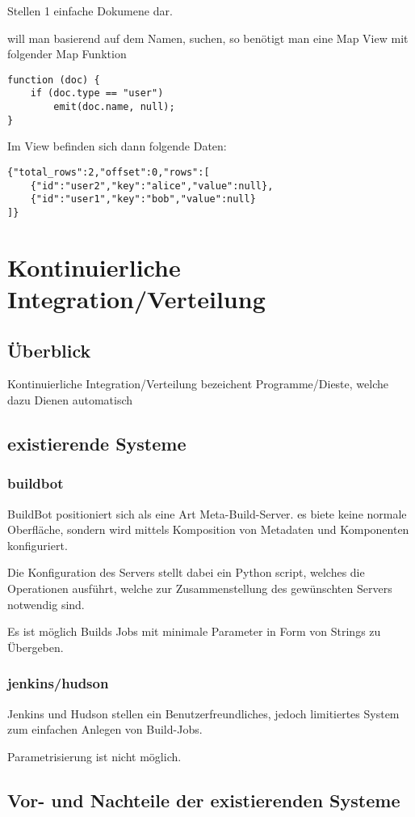 Stellen 1 einfache Dokumene dar.

will man basierend auf dem Namen, suchen, so benötigt man eine Map View mit folgender Map Funktion

\begin{verbatim}
function (doc) {
    if (doc.type == "user")
        emit(doc.name, null);
}
\end{verbatim}

Im View befinden sich dann folgende Daten:

\begin{verbatim}
{"total_rows":2,"offset":0,"rows":[
    {"id":"user2","key":"alice","value":null},
    {"id":"user1","key":"bob","value":null}
]}
\end{verbatim}



\section{Kontinuierliche Integration/Verteilung}

\subsection{Überblick}

Kontinuierliche Integration/Verteilung bezeichent Programme/Dieste,
welche dazu Dienen automatisch 

\subsection{existierende Systeme}

\subsubsection{buildbot}

BuildBot positioniert sich als eine Art Meta-Build-Server.
es biete keine normale Oberfläche, sondern wird mittels
Komposition von Metadaten und Komponenten konfiguriert.

Die Konfiguration des Servers stellt dabei ein Python script,
welches die Operationen ausführt, welche zur Zusammenstellung des gewünschten Servers notwendig sind.

Es ist möglich Builds Jobs mit minimale Parameter in Form von Strings zu Übergeben.

\subsubsection{jenkins/hudson}

Jenkins und Hudson stellen ein Benutzerfreundliches,
jedoch limitiertes System zum einfachen Anlegen von Build-Jobs.

Parametrisierung ist nicht möglich.

\subsection{Vor- und Nachteile der existierenden Systeme}

